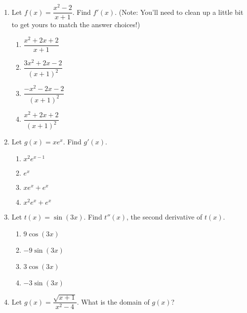 \documentclass{article}
\begin{document}
\begin{enumerate}



\item Let $f(x)=\dfrac{x^2-2}{x+1}$. Find $f'(x)$. (Note: You'll need to clean up a little bit to get yours to match the answer choices!)

  \begin{enumerate}
  
  
  \item $\dfrac{x^2+2x+2}{x+1}$ %
  \item $\dfrac{3x^2+2x-2}{(x+1)^2}$ %
  \item $\dfrac{-x^2-2x-2}{(x+1)^2}$ %
  \item $\dfrac{x^2+2x+2}{(x+1)^2}$ %
  \end{enumerate}



\item Let $g(x)=xe^x$. Find $g'(x)$.

  \begin{enumerate}
  
  \item $x^2e^{x-1}$ %
  \item $e^x$ %
  \item $xe^x+e^x$ %
  \item $x^2e^x+e^x$ %
  \end{enumerate}



\item Let $t(x)=\sin(3x)$. Find $t''(x)$, the second derivative of $t(x)$.

  \begin{enumerate}
  
  \item $9\cos(3x)$ 
  \item $-9\sin(3x)$ %
  \item $3\cos(3x)$ %
  \item $-3\sin(3x)$ %
  \end{enumerate}





\item Let $g(x)=\dfrac{\sqrt{x+1}}{x^2-4}$. What is the domain of $g(x)$?


\end{enumerate}
\end{document}
